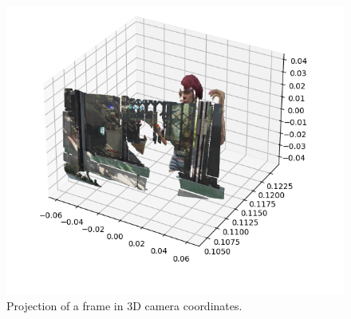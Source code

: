 \begin{figure}

\centering
\includegraphics[scale=0.5]{fig/3dproj.png}
\caption{Projection of a frame in 3D camera coordinates.}
\label{fig:3Dproj}
\end{figure}






